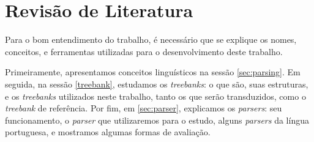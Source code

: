 
\chapter{Revisão de Literatura}

Para o bom entendimento do trabalho, é necessário que se explique os nomes, conceitos, e ferramentas utilizadas para o desenvolvimento deste trabalho.

Primeiramente, apresentamos conceitos linguísticos na sessão \ref{sec:parsing}. Em seguida, na sessão \ref{treebank}, estudamos os \textit{treebanks}: o que são, suas estruturas, e os \textit{treebanks} utilizados neste trabalho, tanto os que serão transduzidos, como o \textit{treebank} de referência. Por fim, em \ref{sec:parser}, explicamos os  \textit{parsers}: seu funcionamento, o \textit{parser} que utilizaremos para o estudo, alguns \textit{parsers} da língua portuguesa, e mostramos algumas formas de avaliação.



